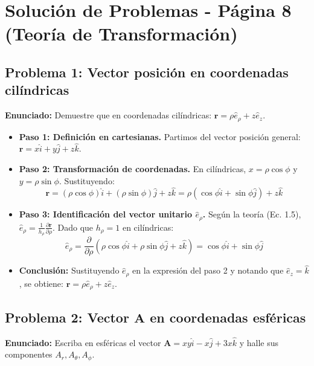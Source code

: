 \documentclass[a4paper]{article}
\begin{document}
\section*{Solución de Problemas - Página 8 (Teoría de Transformación)}

\subsection*{Problema 1: Vector posición en coordenadas cilíndricas}
\textbf{Enunciado:} Demuestre que en coordenadas cilíndricas: $\mathbf{r} = \rho\hat{e}_\rho + z\hat{e}_z$.

\begin{itemize}
    \item \textbf{Paso 1: Definición en cartesianas.} Partimos del vector posición general: $\mathbf{r} = x\hat{i} + y\hat{j} + z\hat{k}$.
    \item \textbf{Paso 2: Transformación de coordenadas.} En cilíndricas, $x = \rho \cos\phi$ y $y = \rho \sin\phi$. Sustituyendo:
    \begin{equation}
        \mathbf{r} = (\rho \cos\phi)\hat{i} + (\rho \sin\phi)\hat{j} + z\hat{k} = \rho (\cos\phi \hat{i} + \sin\phi \hat{j}) + z\hat{k}
    \end{equation}
    \item \textbf{Paso 3: Identificación del vector unitario $\hat{e}_\rho$.} Según la teoría (Ec. 1.5), $\hat{e}_\rho = \frac{1}{h_\rho} \frac{\partial \mathbf{r}}{\partial \rho}$. Dado que $h_\rho = 1$ en cilíndricas:
    \begin{equation}
        \hat{e}_\rho = \frac{\partial}{\partial \rho} (\rho \cos\phi \hat{i} + \rho \sin\phi \hat{j} + z\hat{k}) = \cos\phi \hat{i} + \sin\phi \hat{j}
    \end{equation}
    \item \textbf{Conclusión:} Sustituyendo $\hat{e}_\rho$ en la expresión del paso 2 y notando que $\hat{e}_z = \hat{k}$, se obtiene: $\mathbf{r} = \rho\hat{e}_\rho + z\hat{e}_z$.
\end{itemize}

\subsection*{Problema 2: Vector $\mathbf{A}$ en coordenadas esféricas}
\textbf{Enunciado:} Escriba en esféricas el vector $\mathbf{A} = xy\hat{i} - x\hat{j} + 3x\hat{k}$ y halle sus componentes $A_r, A_\theta, A_\phi$.
\end{document}
